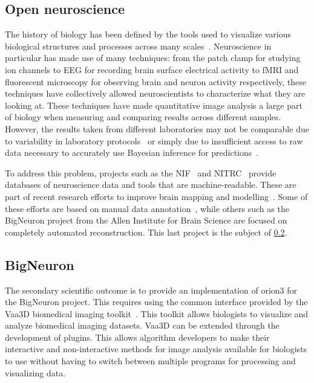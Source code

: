 \subsection{Open neuroscience}
The history of biology has been defined by the tools used to
visualize various biological structures and processes across many
scales~\autocite{moore2012visualizing}. Neuroscience in particular has
made use of many techniques: from the patch clamp for studying ion
channels to \acrshort{EEG} for recording brain surface electrical
activity to \acrshort{fMRI} and fluorescent microscopy for
observing brain and neuron activity respectively, these techniques
have collectively allowed neuroscientists to characterize what
they are looking at.  These techniques have made quantitative
image analysis a large part of biology when measuring and
comparing results across different samples. However, the results
taken from different laboratories may not be comparable due to
variability in laboratory protocols~\autocite{NeuroMorphVariability:Parekh:2015}
or simply due to insufficient access to raw data necessary
to accurately use Bayesian inference for
predictions~\autocite{Poldrack2011}.

To address this problem, projects such as the \acrfull{NIF}~\autocite{Gardner2008}
and \acrfull{NITRC}~\autocite{Kennedy2016} provide databases of neuroscience data
and tools that are machine-readable. These are part of recent research efforts
to improve brain mapping and modelling~\autocite{Markram2013,BigBrainIEEESpectrum:2013}.
Some of these efforts are based on manual data annotation~\autocite{Ascoli2007,Helmstaedter2011,Helmstaedter2012,Marx2013},
while others such as the BigNeuron project from the Allen Institute for
Brain Science are focused on completely automated reconstruction. This last
project is the subject of \cref{subsec:bigneuron}.

\subsection{BigNeuron}\label{subsec:bigneuron}

The secondary scientific outcome is to provide an implementation of
\gls{orion3} for the BigNeuron project. This requires using the common
interface provided by the Vaa3D biomedical imaging
toolkit~\autocite{Vaa3D:site:2015,Vaa3D:Peng:2010,Vaa3D:Peng:2014}.  This
toolkit allows biologists to visualize and analyze biomedical imaging datasets.
Vaa3D can be extended through the development of plugins. This allows algorithm
developers to make their interactive and non-interactive methods for image
analysis available for biologists to use without having to switch between
multiple programs for processing and visualizing data.


